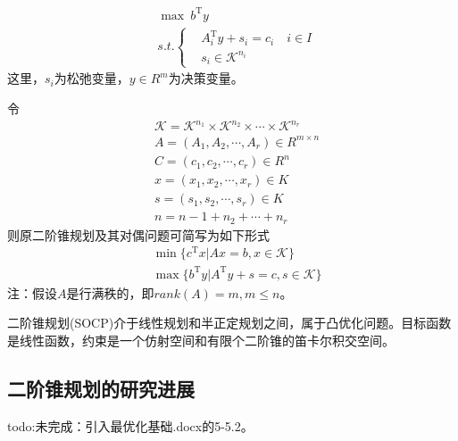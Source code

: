         \begin{align*}
          & \mathop{\max}\ b^\mathrm{T} y\\
          & s.t.\left\{
            \begin{aligned}
          & A_i^\mathrm{T} y+s_i=c_i \quad i\in I\\
          & s_i \in \mathcal{K}^{n_i}
            \end{aligned}
             \right.
        \end{align*}
        这里，$s_i$为松弛变量，$y \in R^{m}$为决策变量。
        \par
        令
        \begin{align*}
          & \mathcal{K}=\mathcal{K}^{n_1}\times \mathcal{K}^{n_2}\times\cdots \times \mathcal{K}^{n_r}\\
          & A=(A_1,A_2,\cdots,A_r)\in R^{m\times n}\\
          & C=(c_1,c_2,\cdots,c_r)\in R^ n \\
          & x=(x_1,x_2,\cdots,x_r)\in K\\
          & s=(s_1,s_2,\cdots,s_r)\in K\\
          & n=n-1+n_2+\cdots+n_r
        \end{align*}
        则原二阶锥规划及其对偶问题可简写为如下形式
        \begin{align*}
          & \mathop{\min}\{c^\mathrm{T} x|Ax=b,x \in \mathcal{K}\}\\
          & \mathop{\max}\{b^\mathrm{T} y|A^\mathrm{T} y+s=c,s \in \mathcal{K}\}
        \end{align*}
        注：假设$A$是行满秩的，即$rank(A)=m,m \leqslant n$。
        \par
        二阶锥规划(SOCP)介于线性规划和半正定规划之间，属于凸优化问题。目标函数是线性函数，约束是一个仿射空间和有限个二阶锥的笛卡尔积交空间。
    \subsection{二阶锥规划的研究进展}
        todo:未完成：引入最优化基础.docx的5-5.2。
